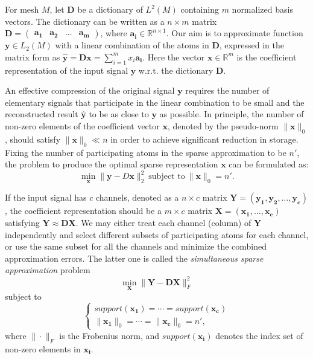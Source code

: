 For mesh $M$, let $\mathbf{D}$ be a dictionary of $L^2(M)$ containing
$m$ normalized basis vectors. The dictionary can be written as a
$n\times m$ matrix $\mathbf{D} = \begin{pmatrix} \mathbf{a_1} &
  \mathbf{a_2} & \ldots & \mathbf{a_m} \end{pmatrix}$, where
$\mathbf{a_i} \in \mathbb{R}^{n\times 1}$. Our aim is to approximate
function $\mathbf{y}\in L_2(M)$ with a linear combination of the atoms
in $\mathbf{D}$, expressed in the matrix form as
$\widehat{\mathbf{y}}=\mathbf{D}\mathbf{x}=\sum_{i=1}^m
x_i\mathbf{a_i}$. Here the vector $\mathbf{x}\in\mathbb{R}^m$ is the
coefficient representation of the input signal $\mathbf{y}$ w.r.t. the
dictionary $\mathbf{D}$.

An effective compression of the original signal $\mathbf{y}$ requires
the number of elementary signals that participate in the linear
combination to be small and the reconstructed result
$\widehat{\mathbf{y}}$ to be as close to $\mathbf{y}$ as possible. In
principle, the number of non-zero elements of the coefficient vector
$\mathbf{x}$, denoted by the pseudo-norm $\|\mathbf{x}\|_0$, should
satisfy $\|\mathbf{x}\|_0 \ll n$ in order to achieve significant
reduction in storage. Fixing the number of participating atoms in the
sparse approximation to be $n'$, the problem to produce the optimal
sparse representation $\mathbf{x}$ can be formulated as:
\begin{equation}
  \min_{\mathbf{x}} \|\mathbf{y}-D\mathbf{x}\|_2^2\ \textrm{subject\ to}\ \|\mathbf{x}\|_0 = n'.
\label{eq:sa}
\end{equation}

If the input signal has $c$ channels, denoted as a $n\times c$ matrix
$\mathbf{Y}=(\mathbf{y_1},\mathbf{y_2},\ldots,\mathbf{y_c})$, the
coefficient representation should be a $m\times c$ matrix
$\mathbf{X}=(\mathbf{x_1},\ldots,\mathbf{x_c})$ satisfying $\mathbf{Y}
\approx \mathbf{D}\mathbf{X}$. We may either treat each channel
(column) of $\mathbf{Y}$ independently and select different subsets of
participating atoms for each channel, or use the same subset for all
the channels and minimize the combined approximation errors. The
latter one is called the \emph{simultaneous sparse approximation} problem
\begin{equation*}
  \min_{\mathbf{X}} \|\mathbf{Y}-\mathbf{D}\mathbf{X}\|_F^2
\end{equation*}
subject to
\begin{equation}
\begin{cases}
    support(\mathbf{x_1})=\cdots=support(\mathbf{x_c})\\
    \|\mathbf{x_1}\|_0=\cdots=\|\mathbf{x_c}\|_0=n',
\end{cases}
\label{eq:simulsa}
\end{equation}
where $\|\cdot\|_F$ is the Frobenius norm, and $support(\mathbf{x_i})$
denotes the index set of non-zero elements in $\mathbf{x_i}$.

